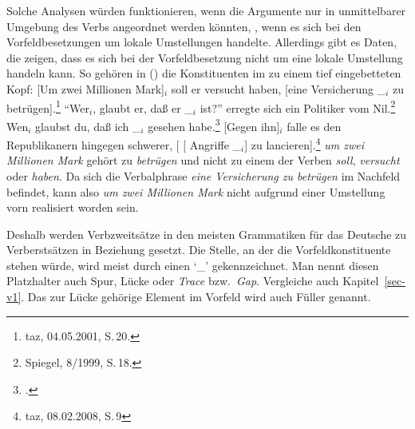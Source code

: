 Solche Analysen würden funktionieren, wenn die Argumente nur in unmittelbarer Umgebung des Verbs angeordnet
werden könnten, \dash, wenn es sich bei den Vorfeldbesetzungen um lokale Umstellungen handelte.
Allerdings gibt es Daten, die zeigen, dass es sich bei der Vorfeldbesetzung nicht um eine lokale Umstellung handeln kann.
So gehören in () die Konstituenten im \vf zu einem tief eingebetteten Kopf:
\eal
\ex\label{bsp-um-zwei-millionen}
{}[Um zwei Millionen Mark]$_i$ soll er versucht haben, [eine Versicherung \_$_i$ zu betrügen].\footnote{
         taz, 04.05.2001, S.\,20.
}
\ex
"`Wer$_i$, glaubt er, daß er \_$_i$ ist?"' erregte sich ein Politiker vom Nil.\footnote{
        Spiegel, 8/1999, S.\,18.
}
\ex Wen$_i$ glaubst du, daß ich \_$_i$ gesehen habe.\footnote{
    .
    }
\ex {}[Gegen ihn]$_i$ falle es den Republikanern hingegen schwerer, [ [ Angriffe \_$_i$] zu lancieren].\footnote{
  taz, 08.02.2008, S.\,9
}
\zl
\emph{um zwei Millionen Mark} gehört zu \emph{betrügen} und nicht zu einem der Verben \emph{soll}, \emph{versucht}
oder \emph{haben}. Da sich die Verbalphrase \emph{eine Versicherung zu betrügen} im Nachfeld befindet, kann
also \emph{um zwei Millionen Mark} nicht aufgrund einer Umstellung vorn realisiert worden sein.

Deshalb werden Verbzweitsätze in den meisten Grammatiken für das Deutsche zu Verberstsätzen in Beziehung gesetzt.
Die Stelle, an der die Vorfeldkonstituente stehen würde, wird meist durch einen `\_' gekennzeichnet. Man nennt
diesen Platzhalter auch Spur, Lücke oder \emph{Trace} bzw.\ \emph{Gap}.
Vergleiche auch Kapitel~\ref{sec-v1}.
Das zur Lücke gehörige Element im Vorfeld wird auch Füller genannt.

